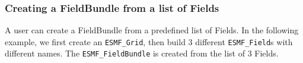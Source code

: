 
\setlength{\oldparskip}{\parskip}
\setlength{\parskip}{1.5ex}
\setlength{\oldparindent}{\parindent}
\setlength{\parindent}{0pt}
\setlength{\oldbaselineskip}{\baselineskip}
\setlength{\baselineskip}{11pt}
 
\def\bv{\begin{verbatim}}
\def\ev{\end{verbatim}}
\def\be{\begin{equation}}
\def\ee{\end{equation}}
\def\bea{\begin{eqnarray}}
\def\eea{\end{eqnarray}}
\def\bi{\begin{itemize}}
\def\ei{\end{itemize}}
\def\bn{\begin{enumerate}}
\def\en{\end{enumerate}}
\def\bd{\begin{description}}
\def\ed{\end{description}}
\def\({\left (}
\def\){\right )}
\def\[{\left [}
\def\]{\right ]}
\def\<{\left  \langle}
\def\>{\right \rangle}
\def\cI{{\cal I}}
\def\diag{\mathop{\rm diag}}
\def\tr{\mathop{\rm tr}}


 

   \subsubsection{Creating a FieldBundle from a list of Fields}
   \label{sec:fieldbundle:usage:create_list}
   A user can create a FieldBundle from a predefined list of Fields. In the following
   example, we first create an {\tt ESMF\_Grid}, then build 3 different {\tt ESMF\_Field}s with 
   different names. The {\tt ESMF\_FieldBundle} is created from the list of 3 Fields.
   

